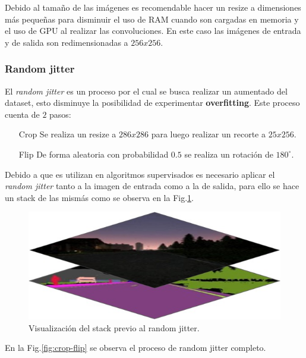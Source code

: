 \documentclass[]{IEEEtran}
\begin{document}
    Debido al tamaño de las imágenes es recomendable hacer un resize a dimensiones más pequeñas 
    para disminuir el uso de RAM cuando son cargadas en memoria y el uso de GPU al realizar las convoluciones. En 
    este caso las imágenes de entrada y de salida son redimensionadas a $256x256$.

    \subsubsection{Random jitter}

    El \textit{random jitter} es un proceso por el cual se busca realizar un aumentado
    del dataset, esto disminuye la posibilidad de experimentar \textbf{overfitting}. 
    Este proceso cuenta de $2$ pasos:

    \begin{itemize}
        \item[Crop] Se realiza un resize a $286x286$ para luego realizar un recorte a $25x256$.
        \item[Flip] De forma aleatoria con probabilidad $0.5$ se realiza un rotación de $180^\circ$. 
    \end{itemize}

    Debido a que es utilizan en algoritmos supervisados es necesario aplicar 
    el \textit{random jitter} tanto a la imagen de entrada como a la de salida,
    para ello se hace un stack de las mismás como se observa en la Fig.\ref{fig:random-jitter}.

    \begin{figure}
        \centering
        \includegraphics[width=.4\textwidth]{Imgs/stack-random-jitter.jpeg}
        \caption{Visualización del stack previo al random jitter.}
        \label{fig:random-jitter}
    \end{figure}

    En la Fig.\ref{fig:crop-flip} se observa el proceso de random jitter completo.
\end{document}
